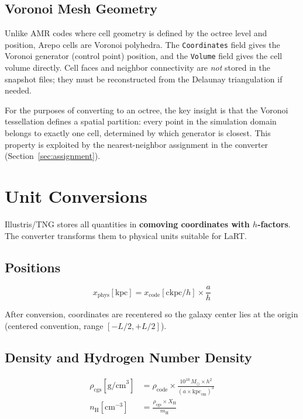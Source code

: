 \documentclass[english,a4paper]{my_memo}
\begin{document}
\subsection{Voronoi Mesh Geometry}

Unlike AMR codes where cell geometry is defined by the octree level
and position, Arepo cells are Voronoi polyhedra.  The \texttt{Coordinates}
field gives the Voronoi generator (control point) position, and the
\texttt{Volume} field gives the cell volume directly.  Cell faces and
neighbor connectivity are \emph{not} stored in the snapshot files;
they must be reconstructed from the Delaunay triangulation if needed.

For the purposes of converting to an octree, the key insight is that
the Voronoi tessellation defines a spatial partition: every point
in the simulation domain belongs to exactly one cell, determined by
which generator is closest.  This property is exploited by the
nearest-neighbor assignment in the converter (Section~\ref{sec:assignment}).


\section{Unit Conversions}
\label{sec:units}

Illustris/TNG stores all quantities in \textbf{comoving coordinates with
$h$-factors}.  The converter transforms them to physical units suitable
for LaRT.

\subsection{Positions}

\begin{equation}
x_\mathrm{phys}[\mathrm{kpc}]
  = x_\mathrm{code}[\mathrm{ckpc}/h] \times \frac{a}{h}
\end{equation}

After conversion, coordinates are recentered so the galaxy center lies
at the origin (centered convention, range $[-L/2, +L/2]$).

\subsection{Density and Hydrogen Number Density}

\begin{align}
\rho_\mathrm{cgs}[\mathrm{g/cm}^3]
  &= \rho_\mathrm{code} \times
     \frac{10^{10}\,M_\odot \times h^2}
          {(a \times \mathrm{kpc}_\mathrm{cm})^3} \\[6pt]
n_\mathrm{H}[\mathrm{cm}^{-3}]
  &= \frac{\rho_\mathrm{cgs} \times X_\mathrm{H}}{m_\mathrm{H}}
\end{align}
\end{document}
